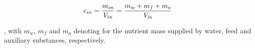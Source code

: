 \documentclass{scrartcl}
\begin{document}
\begin{align}
	c_{in} = \frac{m_{in}}{V_{in}} = \frac{m_{w} + m_{f} + m_{a}}{V_{\ce{in}}}
\end{align}

, with $m_{w}$, $m_{f}$ and $m_{a}$ denoting for the nutrient mass supplied by water, feed and auxiliary substances, respectively.\\














	
\end{document}
